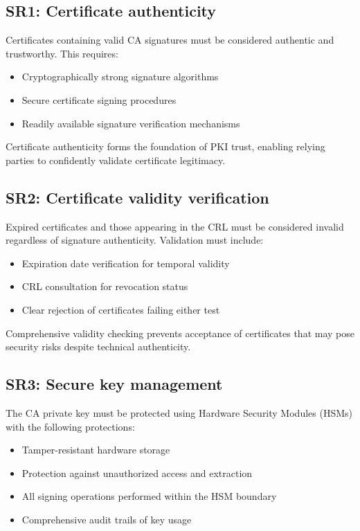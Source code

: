 \subsection{SR1: Certificate authenticity}

Certificates containing valid CA signatures must be considered authentic and 
trustworthy. This requires:

\begin{itemize}
    \item Cryptographically strong signature algorithms
    \item Secure certificate signing procedures
    \item Readily available signature verification mechanisms
\end{itemize}

Certificate authenticity forms the foundation of PKI trust, enabling relying 
parties to confidently validate certificate legitimacy.

\subsection{SR2: Certificate validity verification}

Expired certificates and those appearing in the CRL must be considered invalid 
regardless of signature authenticity. Validation must include:

\begin{itemize}
    \item Expiration date verification for temporal validity
    \item CRL consultation for revocation status
    \item Clear rejection of certificates failing either test
\end{itemize}

Comprehensive validity checking prevents acceptance of certificates that may 
pose security risks despite technical authenticity.

\subsection{SR3: Secure key management}

The CA private key must be protected using Hardware Security Modules (HSMs) 
with the following protections:

\begin{itemize}
    \item Tamper-resistant hardware storage
    \item Protection against unauthorized access and extraction
    \item All signing operations performed within the HSM boundary
    \item Comprehensive audit trails of key usage
\end{itemize}


